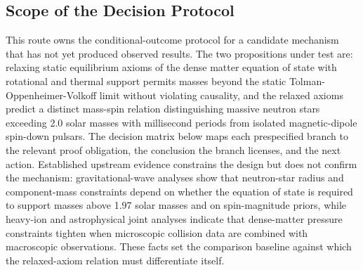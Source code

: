 \documentclass[conference]{IEEEtran}
\begin{document}
\subsection{Scope of the Decision Protocol}
This route owns the conditional-outcome protocol for a candidate mechanism that has not yet produced observed results. The two propositions under test are: relaxing static equilibrium axioms of the dense matter equation of state with rotational and thermal support permits masses beyond the static Tolman-Oppenheimer-Volkoff limit without violating causality, and the relaxed axioms predict a distinct mass-spin relation distinguishing massive neutron stars exceeding 2.0 solar masses with millisecond periods from isolated magnetic-dipole spin-down pulsars. The decision matrix below maps each prespecified branch to the relevant proof obligation, the conclusion the branch licenses, and the next action. Established upstream evidence constrains the design but does not confirm the mechanism: gravitational-wave analyses show that neutron-star radius and component-mass constraints depend on whether the equation of state is required to support masses above 1.97 solar masses and on spin-magnitude priors, while heavy-ion and astrophysical joint analyses indicate that dense-matter pressure constraints tighten when microscopic collision data are combined with macroscopic observations. These facts set the comparison baseline against which the relaxed-axiom relation must differentiate itself.~\cite{cite_42e341ff6471ce89,cite_6c11517977d0b39d,cite_81b31d0d8218f9b8}
\end{document}
